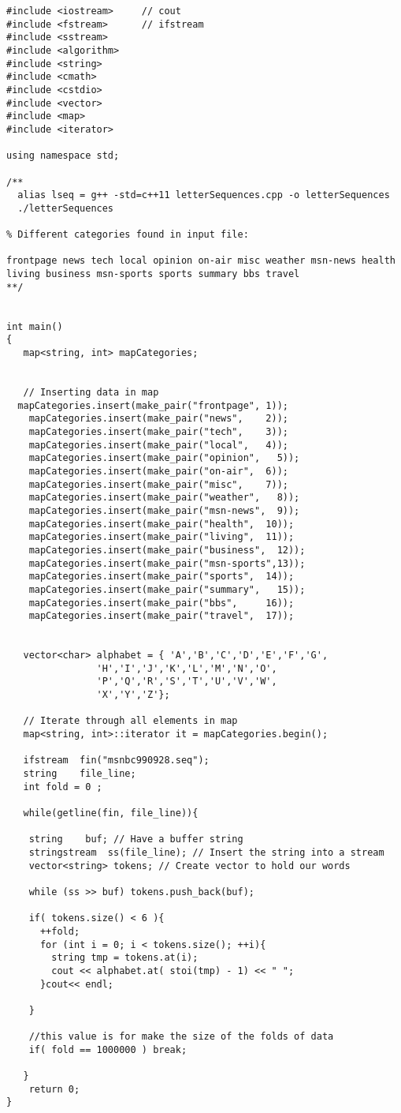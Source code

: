 \begin{lstlisting}[frame=single,basicstyle=\ttfamily\tiny,]
#include <iostream>     // cout
#include <fstream>      // ifstream
#include <sstream>
#include <algorithm>
#include <string>
#include <cmath>
#include <cstdio>
#include <vector>
#include <map>
#include <iterator>

using namespace std;

/** 
  alias lseq = g++ -std=c++11 letterSequences.cpp -o letterSequences 
  ./letterSequences

% Different categories found in input file:

frontpage news tech local opinion on-air misc weather msn-news health living business msn-sports sports summary bbs travel
**/

 
int main()
{
   map<string, int> mapCategories;

  
   // Inserting data in map
  mapCategories.insert(make_pair("frontpage", 1));
    mapCategories.insert(make_pair("news",    2));
    mapCategories.insert(make_pair("tech",    3));
    mapCategories.insert(make_pair("local",   4));
    mapCategories.insert(make_pair("opinion",   5));
    mapCategories.insert(make_pair("on-air",  6));
    mapCategories.insert(make_pair("misc",    7));
    mapCategories.insert(make_pair("weather",   8));
    mapCategories.insert(make_pair("msn-news",  9));
    mapCategories.insert(make_pair("health",  10));
    mapCategories.insert(make_pair("living",  11));
    mapCategories.insert(make_pair("business",  12));
    mapCategories.insert(make_pair("msn-sports",13));
    mapCategories.insert(make_pair("sports",  14));
    mapCategories.insert(make_pair("summary",   15));
    mapCategories.insert(make_pair("bbs",     16));
    mapCategories.insert(make_pair("travel",  17));
    

   vector<char> alphabet = { 'A','B','C','D','E','F','G',
                'H','I','J','K','L','M','N','O',
                'P','Q','R','S','T','U','V','W',
                'X','Y','Z'};

   // Iterate through all elements in map
   map<string, int>::iterator it = mapCategories.begin();

   ifstream  fin("msnbc990928.seq");
   string    file_line;
   int fold = 0 ;

   while(getline(fin, file_line)){

    string    buf; // Have a buffer string
    stringstream  ss(file_line); // Insert the string into a stream
    vector<string> tokens; // Create vector to hold our words
    
    while (ss >> buf) tokens.push_back(buf);

    if( tokens.size() < 6 ){
      ++fold;
      for (int i = 0; i < tokens.size(); ++i){
        string tmp = tokens.at(i); 
        cout << alphabet.at( stoi(tmp) - 1) << " ";
      }cout<< endl;

    }

    //this value is for make the size of the folds of data
    if( fold == 1000000 ) break;

   }
    return 0;
}
\end{lstlisting}







